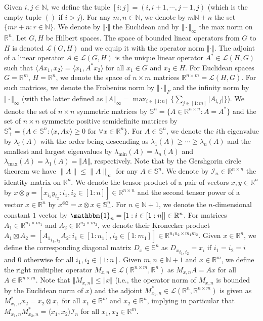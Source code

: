 \documentclass[twoside,11pt]{article}
\newcommand{\R}{\mathbb{R}}
\newcommand{\N}{\mathbb{N}}
\newcommand{\Ell}{\mathcal{L}}
\newcommand{\Id}{\mathcal{I}}
\begin{document}
Given $i, j \in \N$, we define the tuple $[i:j] = (i,i+1,\cdots,j-1,j)$ (which is the empty tuple $()$ if $i > j$). For any $m, n \in \N$, we denote by $m\N+n$ the set $\{mr+n : r \in \N\}$. We denote by $\Vert \cdot \Vert$ the Euclidean and by $\Vert \cdot \Vert_\infty$ the max norm on $\R^n$. Let $G,H$ be Hilbert spaces. The space of bounded linear operators from $G$ to $H$ is denoted $\Ell(G,H)$ and we equip it with the operator norm $\Vert\cdot\Vert$. The adjoint of a linear operator $A \in \Ell(G,H)$ is the unique linear operator $A^* \in \Ell(H,G)$ such that $\langle A x_1, x_2 \rangle = \langle x_1, A^* x_2 \rangle$ for all $x_1 \in G$ and $x_2 \in H$. For Euclidean spaces $G=\R^m$, $H=\R^n$, we denote the space of $n \times m$ matrices $\R^{n \times m} = \Ell(H,G)$. For such matrices, we denote the Frobenius norm by $\Vert \cdot \Vert_F$ and the infinity norm by $\Vert \cdot \Vert_\infty$ (with the latter defined as $\Vert A \Vert_\infty = \max_{i \in [1:n]}\{ \sum_{j \in [1:m]} \vert A_{i,j} \vert \}$). We denote the set of $n \times n$ symmetric matrices by $\mathbb{S}^n = \{ A \in \R^{n \times n} : A = A^*\}$ and the set of $n \times n$ symmetric positive semidefinite matrices by $\mathbb{S}^n_+ = \{ A \in \mathbb{S}^n : \langle x, A x \rangle \geq 0 \text{ for } \forall x \in \R^n \}$. For $A \in \mathbb{S}^n$, we denote the $i$th eigenvalue by $\lambda_i(A)$ with the order being descending as $\lambda_1(A) \geq \cdots \geq \lambda_n(A)$ and the smallest and largest eigenvalues by $\lambda_{\min}(A)=\lambda_n(A)$ and $\lambda_{\max}(A)=\lambda_1(A)=\Vert A \Vert$, respectively. Note that by the Gershgorin circle theorem we have $\|A\| \le \|A\|_\infty$ for any $A \in \mathbb{S}^n$. We denote by $\Id_n \in \R^{n \times n}$ the identity matrix on $\R^n$. We denote the tensor product of a pair of vectors $x,y \in \R^n$ by $x \otimes y = [ x_{i_1} y_{i_2} : i_1,i_2 \in [1:n]] \in \R^{n\times n}$ and the second tensor power of a vector $x \in \R^n$ by $x^{\otimes 2} = x \otimes x\in \mathbb{S}^n_+$. For $n \in \N+1$, we denote the $n$-dimensional constant $1$ vector by $\mathbbm{1}_n = [ 1 : i \in [1:n]] \in \R^n$. For matrices $A_1 \in \R^{n_1 \times m_1}$ and $A_2 \in \R^{n_2 \times m_2}$, we denote their Kronecker product $A_1 \boxtimes A_2 = [ {A_1}_{i_1,i_2} A_2 : i_1 \in [1:n_1], i_2 \in [1:m_1]] \in \R^{n_1 n_2 \times m_1 m_2}$. Given $x \in \R^n$, we define the corresponding diagonal matrix $D_x \in \mathbb{S}^n$ as ${D_x}_{i_1,i_2} = x_i$ if $i_1 = i_2 = i$ and $0$ otherwise for all $i_1,i_2 \in [1:n]$. Given $m, n \in \N+1$ and $x \in \R^m$, we define the right multiplier operator $M_{x,n} \in \Ell(\R^{n \times m}, \R^n)$ as $M_{x,n} A = A x$ for all $A \in \R^{n \times m}$. Note that $\Vert M_{x,n} \Vert \leq \Vert x \Vert$ (i.e., the operator norm of $M_{x,n}$ is bounded by the Euclidean norm of $x$) and the adjoint $M_{x_1,n}^* \in \Ell(\R^n, \R^{n \times m})$ is given as $M_{x_1,n}^* x_2 = x_2 \otimes x_1$ for all $x_1 \in \R^m$ and $x_2 \in \R^n$, implying in particular that $M_{x_1,n} M_{x_2,n}^* = \langle x_1, x_2 \rangle \Id_n$ for all $x_1,x_2 \in \R^m$.
\end{document}
